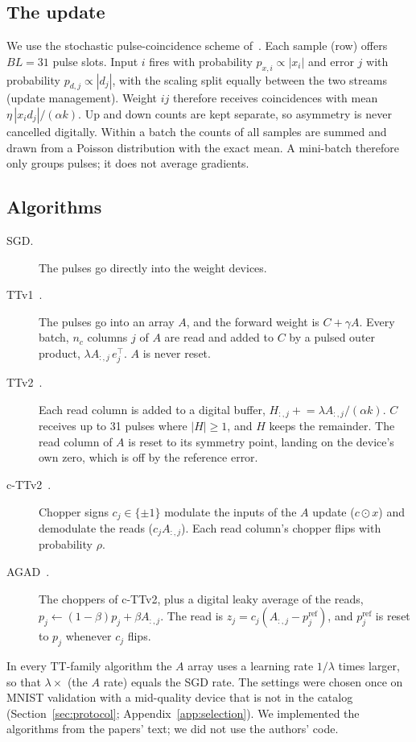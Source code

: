 \subsection{The update}\label{sec:update}
We use the stochastic pulse-coincidence scheme of~\cite{gokmen2016}. Each sample (row) offers $BL=31$ pulse slots. Input $i$
fires with probability $p_{x,i}\propto|x_i|$ and error $j$ with probability $p_{d,j}\propto|d_j|$, with the scaling split equally
between the two streams (update management). Weight $ij$ therefore receives coincidences with mean
$\eta\,|x_i d_j|/(\alpha k)$. Up and down counts are kept separate, so asymmetry is never cancelled digitally. Within a batch the
counts of all samples are summed and drawn from a Poisson distribution with the exact mean. A mini-batch therefore only groups
pulses; it does not average gradients.

\subsection{Algorithms}\label{sec:algos}
\begin{description}
\item[SGD.] The pulses go directly into the weight devices.
\item[TTv1~\cite{gokmen2020}.] The pulses go into an array $A$, and the forward weight is $C+\gamma A$. Every batch, $n_c$ columns
      $j$ of $A$ are read and added to $C$ by a pulsed outer product, $\lambda A_{:,j}\,e_j^{\top}$. $A$ is never reset.
\item[TTv2~\cite{gokmen2021}.] Each read column is added to a digital buffer, $H_{:,j}\mathrel{+}=\lambda A_{:,j}/(\alpha k)$.
      $C$ receives up to 31 pulses where $|H|\ge1$, and $H$ keeps the remainder. The read column of $A$ is reset to its symmetry
      point, landing on the device's own zero, which is off by the reference error.
\item[c-TTv2~\cite{rasch2024}.] Chopper signs $c_j\in\{\pm1\}$ modulate the inputs of the $A$ update ($c\odot x$) and demodulate
      the reads ($c_jA_{:,j}$). Each read column's chopper flips with probability $\rho$.
\item[AGAD~\cite{rasch2024}.] The choppers of c-TTv2, plus a digital leaky average of the reads,
      $p_j\leftarrow(1-\beta)p_j+\beta A_{:,j}$. The read is $z_j=c_j(A_{:,j}-p^{\mathrm{ref}}_j)$, and $p^{\mathrm{ref}}_j$ is
      reset to $p_j$ whenever $c_j$ flips.
\end{description}
In every TT-family algorithm the $A$ array uses a learning rate $1/\lambda$ times larger, so that $\lambda\times$ (the $A$ rate)
equals the SGD rate. The settings were chosen once on MNIST validation with a mid-quality device that is not in the catalog
(Section~\ref{sec:protocol}; Appendix~\ref{app:selection}). We implemented the algorithms from the papers' text; we did not
use the authors' code.

